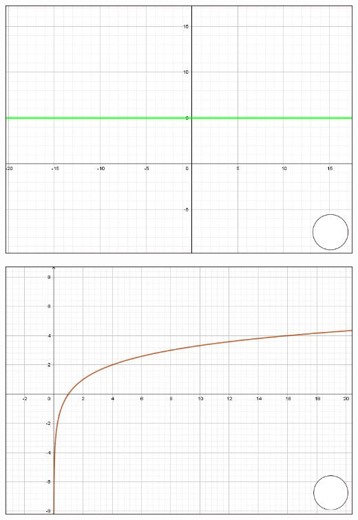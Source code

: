 \documentclass[12pt, addpoints, answers]{exam}
\begin{document}
\begin{questions}
\begin{minipage}[t]{0.23\linewidth}
\end{minipage}\hfill
\begin{minipage}[t]{0.23\linewidth}
	\includegraphics[width=1\linewidth]{Figuras/fig3}
\end{minipage}\hfill
\begin{minipage}[t]{0.23\linewidth}
	\includegraphics[width=1\linewidth]{Figuras/fig4}
\end{minipage}
\par\vspace{1cm} %
\noindent		

\end{questions}
\end{document}
